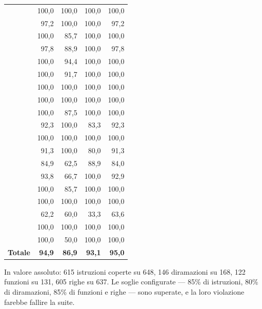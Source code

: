 \begin{longtable}{@{}L{7.6cm} r r r r@{}}
 & 100,0 & 100,0 & 100,0 & 100,0 \\
        &  97,2 & 100,0 & 100,0 &  97,2 \\
       & 100,0 &  85,7 & 100,0 & 100,0 \\
           &  97,8 &  88,9 & 100,0 &  97,8 \\
       & 100,0 &  94,4 & 100,0 & 100,0 \\
      & 100,0 &  91,7 & 100,0 & 100,0 \\
\midrule
{}                    & 100,0 & 100,0 & 100,0 & 100,0 \\
                & 100,0 & 100,0 & 100,0 & 100,0 \\
               & 100,0 &  87,5 & 100,0 & 100,0 \\
                    &  92,3 & 100,0 &  83,3 &  92,3 \\
                & 100,0 & 100,0 & 100,0 & 100,0 \\
               &  91,3 & 100,0 &  80,0 &  91,3 \\
\midrule
{}                &  84,9 &  62,5 &  88,9 &  84,0 \\
        &  93,8 &  66,7 & 100,0 &  92,9 \\
            & 100,0 &  85,7 & 100,0 & 100,0 \\
        & 100,0 & 100,0 & 100,0 & 100,0 \\
              &  62,2 &  60,0 &  33,3 &  63,6 \\
\midrule
{}                & 100,0 & 100,0 & 100,0 & 100,0 \\
                      & 100,0 &  50,0 & 100,0 & 100,0 \\
\midrule
\textbf{Totale} & \textbf{94,9} & \textbf{86,9} & \textbf{93,1} & \textbf{95,0} \\

\end{longtable}

In valore assoluto: 615 istruzioni coperte su 648, 146 diramazioni su 168,
122 funzioni su 131, 605 righe su 637. Le soglie configurate — 85\% di
istruzioni, 80\% di diramazioni, 85\% di funzioni e righe — sono superate, e
la loro violazione farebbe fallire la suite.

